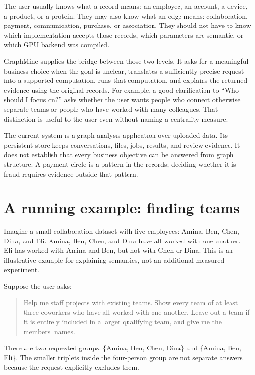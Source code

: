 \documentclass[11pt,a4paper]{article}
\begin{document}
The user usually knows what a record means: an employee, an account, a device,
a product, or a protein. They may also know what an edge means: collaboration,
payment, communication, purchase, or association. They should not have to know
which implementation accepts those records, which parameters are semantic,
or which GPU backend was compiled.

GraphMine supplies the bridge between those two levels. It asks for a meaningful
business choice when the goal is unclear, translates a sufficiently precise
request into a supported computation, runs that computation, and explains the
returned evidence using the original records. For example, a good clarification
to ``Who should I focus on?'' asks whether the user wants people who connect
otherwise separate teams or people who have worked with many colleagues.
That distinction is useful to the user even without naming a centrality measure.

The current system is a graph-analysis application over uploaded data. Its
persistent store keeps conversations, files, jobs, results, and review evidence.
It does not establish that every business objective can be answered from graph
structure. A payment circle is a pattern in the records; deciding whether it is
fraud requires evidence outside that pattern.

\section{A running example: finding teams}
\label{sec:example}

Imagine a small collaboration dataset with five employees: Amina, Ben, Chen,
Dina, and Eli. Amina, Ben, Chen, and Dina have all worked with one another. Eli
has worked with Amina and Ben, but not with Chen or Dina. This is an illustrative
example for explaining semantics, not an additional measured experiment.

Suppose the user asks:
\begin{quote}
Help me staff projects with existing teams. Show every team of at least three
coworkers who have all worked with one another. Leave out a team if it is
entirely included in a larger qualifying team, and give me the members' names.
\end{quote}

There are two requested groups: \{Amina, Ben, Chen, Dina\} and
\{Amina, Ben, Eli\}. The smaller triplets inside the four-person group are not
separate answers because the request explicitly excludes them.
\end{document}
